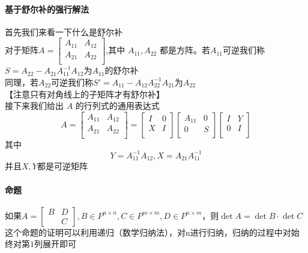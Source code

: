 \documentclass{article}
\begin{document}
\begin{CJK}{UTF8}{gkai}
\paragraph{基于舒尔补的强行解法\\}
首先我们来看一下什么是舒尔补\\

对于矩阵$A=\begin{bmatrix}
A_{11}&A_{12}\\
A_{21}&A_{22}\\ 
\end{bmatrix}
$,其中 $A_{11},A_{22}$ 都是方阵。若$A_{11}$可逆我们称$S=A_{22}-A_{21}A_{11}^{-1}A_{12}$为$A_{11}$的舒尔补\\
同理，若$A_{22}$可逆我们称$S'=A_{11}-A_{12}A_{22}^{-1}A_{21}$为$A_{22}$\\
【注意只有对角线上的子矩阵才有舒尔补】\\


接下来我们给出 $A$ 的行列式的通用表达式\\
\[A=
\begin{bmatrix}
    A_{11}&A_{12}\\
    A_{21}&A_{22}\\ 
\end{bmatrix}
=
\begin{bmatrix}
    I&0\\
    X&I\\ 
\end{bmatrix}
\begin{bmatrix}
    A_{11}&0\\
    0&S\\ 
\end{bmatrix}
\begin{bmatrix}
    I&Y\\
    0&I\\ 
\end{bmatrix}
    \]
其中
\[Y = A_{11}^{-1}A_{12},X=A_{21}A_{11}^{-1}\]
并且$X,Y$都是可逆矩阵\\

\paragraph{命题\\}
如果$A=\begin{bmatrix}B&D\\&C\end{bmatrix},B\in P^{n\times n},C\in P^{m\times m},D\in P^{n\times m}$，则$\det A=\det B\cdot \det C$\\
这个命题的证明可以利用递归（数学归纳法），对n进行归纳，归纳的过程中对始终对第$1$列展开即可\\

\end{CJK}
\end{document}

